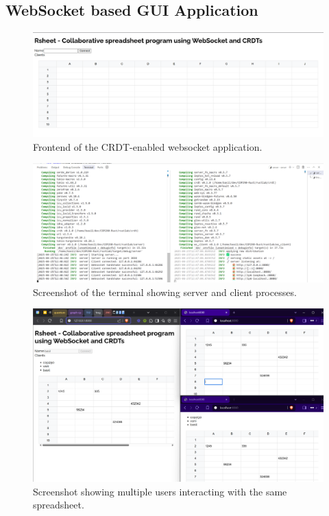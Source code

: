 

\subsection{WebSocket based GUI Application}

 	\begin{figure}[H]
    		\centering
    		\includegraphics[width=0.75\columnwidth]{figures/crdt1.png}
    		\caption{Frontend of the CRDT-enabled websocket application.}
    		\label{fig:figure}
    	\end{figure}

 	\begin{figure}[H]
    		\centering
    		\includegraphics[width=0.75\columnwidth]{figures/crdt2.png}
    		\caption{Screenshot of the terminal showing server and client processes.}
    		\label{fig:figure}
    	\end{figure}

        \begin{figure}[H]
    		\centering
    		\includegraphics[width=0.75\columnwidth]{figures/crdt3.png}
    		\caption{Screenshot showing multiple users interacting with the same spreadsheet.}
    		\label{fig:figure}
    	\end{figure}

